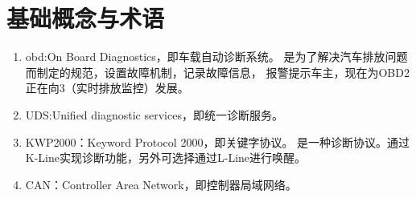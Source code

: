 \section{基础概念与术语}

\begin{enumerate}
	\item obd:On Board Diagnostics，即车载自动诊断系统。
	是为了解决汽车排放问题而制定的规范，设置故障机制，记录故障信息，
	报警提示车主，现在为OBD2正在向3（实时排放监控）发展。
	\item UDS:Unified diagnostic services，即统一诊断服务。
	\item KWP2000：Keyword Protocol 2000，即关键字协议。
	是一种诊断协议。通过K-Line实现诊断功能，另外可选择通过L-Line进行唤醒。
	\item CAN：Controller Area Network，即控制器局域网络。
\end{enumerate}

